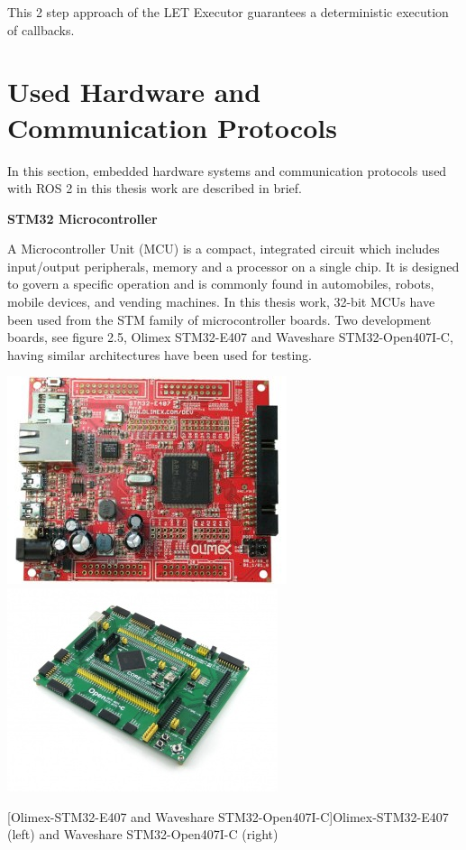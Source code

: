 \documentclass[%
xelatex,
	oneside,		%
	12pt,			%
	parskip=half,	%
	abstracton,
	chapterprefix=true%
    appendixprefix=true]
{scrbook}
\begin{document}
This 2 step approach of the LET Executor guarantees a deterministic execution of callbacks.
 
	\section{Used Hardware and Communication Protocols}
	\vspace*{0.5cm}
In this section, embedded hardware systems and communication protocols used with ROS 2 in this thesis work are described in brief. 	
	\vspace*{0.5cm}
	
	{\bfseries STM32 Microcontroller}
	
	
	\vspace*{0.5cm}
A Microcontroller Unit (MCU) is a compact, integrated circuit which includes input/output peripherals, memory and a processor on a single chip. It is designed to govern a specific operation and is commonly found in automobiles, robots, mobile devices, and vending machines. In this thesis work, 32-bit MCUs have been used from the STM family of microcontroller boards. Two development boards, see figure 2.5, Olimex STM32-E407 and Waveshare STM32-Open407I-C, having similar architectures have been used for testing.

\begin{center}
\includegraphics[scale=0.55]{fig/STM32-E407.jpg}\hspace*{1cm}
\includegraphics[scale=0.65]{fig/Open407I-C.jpg}


[Olimex-STM32-E407 and Waveshare STM32-Open407I-C]{Olimex-STM32-E407 (left) \cite{olimex} and Waveshare STM32-Open407I-C (right) \cite{waveshare}}
\label{fig:stm32}
\end{center}
\vspace*{0.5cm}	
\end{document}
